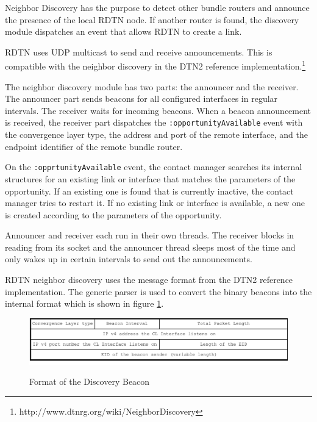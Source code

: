 \documentclass[a4paper]{article}
\begin{document}
Neighbor Discovery has the purpose to detect other bundle routers and announce
the presence of the local RDTN node. If another router is found, the
discovery module dispatches an event that allows RDTN to create a link.

RDTN uses UDP multicast to send and receive announcements. This is compatible
with the neighbor discovery in the DTN2 reference
implementation.\footnote{http://www.dtnrg.org/wiki/NeighborDiscovery} 

The neighbor discovery module has two parts: the announcer and the receiver. The
announcer part sends beacons for all configured interfaces in regular intervals.
The receiver waits for incoming beacons. When a beacon announcement is received,
the receiver part dispatches the {\tt :opportunityAvailable} event with the
convergence layer type, the address and port of the remote interface, and the
endpoint identifier of the remote bundle router.

On the {\tt :opprtunityAvailable} event, the contact manager searches its
internal structures for an existing link or interface that matches the
parameters of the opportunity. If an existing one is found that is currently
inactive, the contact manager tries to restart it. If no existing link or
interface is available, a new one is created according to the parameters of the
opportunity.

Announcer and receiver each run in their own threads. The receiver blocks in
reading from its socket and the announcer thread sleeps most of the time and
only wakes up in certain intervals to send out the announcements.

RDTN neighbor discovery uses the message format from the DTN2 reference
implementation. The generic parser is used to convert the binary beacons into
the internal format which is shown in figure \ref{fig.discovery-format}.

\begin{figure}[h]
\begin{center}
\includegraphics[width=0.9\columnwidth]{discovery-format.pdf}\\
\caption{\label{fig.discovery-format} Format of the Discovery Beacon}
\end{center}
\end{figure}
\end{document}
